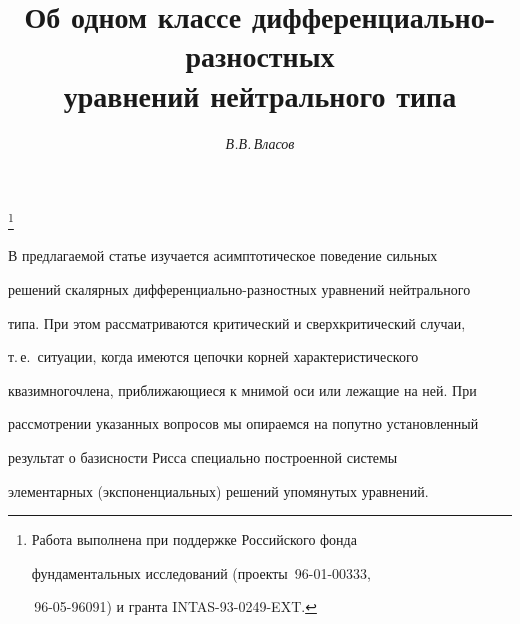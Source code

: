 






\author{\it В.В.\,Власов} 




\title{Об одном классе дифференциально-разностных\\ 


уравнений нейтрального типа} 


\thanks{Работа выполнена при поддержке Российского фонда 


фундаментальных исследований (проекты \No\,96-01-00333, 


\No\,96-05-96091) и гранта INTAS-93-0249-EXT.} 





\date{} 




\pagestyle{plain} %


 




\maketitle 


\label{begin} 


 


 


В предлагаемой статье изучается асимптотическое поведение сильных 


решений скалярных дифференциально-разностных уравнений нейтрального 


типа. При этом рассматриваются критический и сверхкритический случаи, 


т.\,е.~ситуации, когда имеются цепочки корней характеристического 


квазимногочлена, приближающиеся к мнимой оси или лежащие на ней. При 


рассмотрении указанных вопросов мы опираемся на попутно установленный 


результат о базисности Рисса специально построенной системы 


элементарных (экспоненциальных) решений упомянутых уравнений. 


